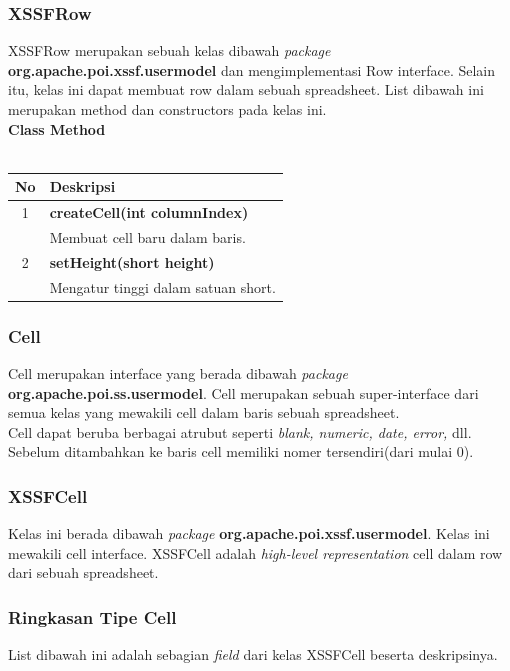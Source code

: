 \subsubsection{XSSFRow}
XSSFRow merupakan sebuah kelas dibawah \textit{package} \textbf{org.apache.poi.xssf.usermodel} dan mengimplementasi Row interface. Selain itu, kelas ini dapat membuat row dalam sebuah spreadsheet. List dibawah ini merupakan method dan constructors pada kelas ini.\cite{apachepoi2}
 \\ 
\noindent \textbf{Class Method}\\ \\
	\begin{tabular}{|c|p{12cm}|}
		\hline
		\textbf{No} & \textbf{Deskripsi} \\ \hline \hline
		1 & \textbf{createCell(int columnIndex)}\\
			&	Membuat cell baru dalam baris.\\ \hline 
		2 & \textbf{setHeight(short height)}\\
			&	Mengatur tinggi dalam satuan short.\\ \hline
	\end{tabular}

\subsubsection{Cell}
Cell merupakan interface yang berada dibawah \textit{package} \textbf{org.apache.poi.ss.usermodel}. Cell merupakan sebuah super-interface dari semua kelas yang mewakili cell dalam baris sebuah spreadsheet.\\

Cell dapat beruba berbagai atrubut seperti \textit{blank, numeric, date, error, } dll. Sebelum ditambahkan ke baris cell memiliki nomer tersendiri(dari mulai 0).\cite{tutpoint}

\subsubsection{XSSFCell}  
Kelas ini berada dibawah \textit{package} \textbf{org.apache.poi.xssf.usermodel}. Kelas ini mewakili cell interface. XSSFCell adalah \textit{high-level representation} cell dalam row dari sebuah spreadsheet.\cite{tutpoint}

\subsubsection{Ringkasan Tipe Cell}
List dibawah ini adalah sebagian \textit{field} dari kelas XSSFCell beserta deskripsinya.\\

